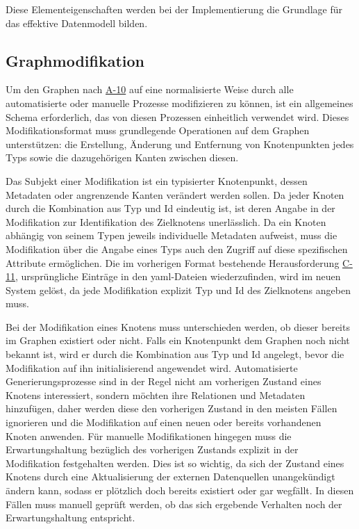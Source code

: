 Diese Elementeigenschaften werden bei der Implementierung die Grundlage für das effektive Datenmodell bilden.

\subsection{Graphmodifikation}\label{subsec:model-graph-modification}

Um den Graphen nach \hyperref[subsec:req-manual-format-modification]{A-10} auf eine normalisierte Weise durch alle automatisierte oder manuelle Prozesse modifizieren zu können, ist ein allgemeines Schema erforderlich, das von diesen Prozessen einheitlich verwendet wird.
Dieses Modifikationsformat muss grundlegende Operationen auf dem Graphen unterstützen: die Erstellung, Änderung und Entfernung von Knotenpunkten jedes Typs sowie die dazugehörigen Kanten zwischen diesen.

Das Subjekt einer Modifikation ist ein typisierter Knotenpunkt, dessen Metadaten oder angrenzende Kanten verändert werden sollen.
Da jeder Knoten durch die Kombination aus Typ und Id eindeutig ist, ist deren Angabe in der Modifikation zur Identifikation des Zielknotens unerlässlich.
Da ein Knoten abhängig von seinem Typen jeweils individuelle Metadaten aufweist, muss die Modifikation über die Angabe eines Typs auch den Zugriff auf diese spezifischen Attribute ermöglichen.
Die im vorherigen Format bestehende Herausforderung \hyperref[subsec:c-11-finding-yaml-entries]{C-11}, ursprüngliche Einträge in den \acrshort{yaml}-Dateien wiederzufinden, wird im neuen System gelöst, da jede Modifikation explizit Typ und Id des Zielknotens angeben muss.

Bei der Modifikation eines Knotens muss unterschieden werden, ob dieser bereits im Graphen existiert oder nicht.
Falls ein Knotenpunkt dem Graphen noch nicht bekannt ist, wird er durch die Kombination aus Typ und Id angelegt, bevor die Modifikation auf ihn initialisierend angewendet wird.
Automatisierte Generierungsprozesse sind in der Regel nicht am vorherigen Zustand eines Knotens interessiert, sondern möchten ihre Relationen und Metadaten hinzufügen, daher werden diese den vorherigen Zustand in den meisten Fällen ignorieren und die Modifikation auf einen neuen oder bereits vorhandenen Knoten anwenden.
Für manuelle Modifikationen hingegen muss die Erwartungshaltung bezüglich des vorherigen Zustands explizit in der Modifikation festgehalten werden.
Dies ist so wichtig, da sich der Zustand eines Knotens durch eine Aktualisierung der externen Datenquellen unangekündigt ändern kann, sodass er plötzlich doch bereits existiert oder gar wegfällt.
In diesen Fällen muss manuell geprüft werden, ob das sich ergebende Verhalten noch der Erwartungshaltung entspricht.

